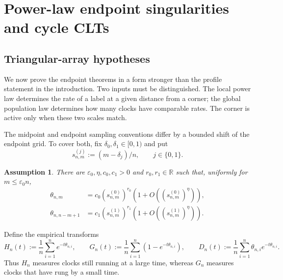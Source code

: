 \documentclass[11pt]{article}
\theoremstyle{remark}
\theoremstyle{plain}
\newtheorem{assumption}[theorem]{Assumption}
\newcommand{\R}{\mathbb R}
\newcommand{\eps}{\varepsilon}
\begin{document}
\section{Power-law endpoint singularities and cycle CLTs}
\label{sec:power-law}

\subsection{Triangular-array hypotheses}

We now prove the endpoint theorems in a form stronger than the profile
statement in the introduction.  Two inputs must be distinguished.  The local
power law determines the rate of a label at a given distance from a corner;
the global population law determines how many clocks have comparable rates.
The corner is active only when these two scales match.

The midpoint and endpoint sampling conventions differ by a bounded shift of
the endpoint grid.  To cover both, fix $\delta_0,\delta_1\in[0,1)$ and put
\[
 s_{n,m}^{(j)}:=(m-\delta_j)/n,
 \qquad j\in\{0,1\}.
\]

\begin{assumption}\label{ass:power-endpoints}
There are $\eps_0,\eta,c_0,c_1>0$ and $r_0,r_1\in\R$ such that, uniformly for
$m\le \eps_0n$,
\begin{align}
 \theta_{n,m}&=c_0(s_{n,m}^{(0)})^{r_0}
   (1+O((s_{n,m}^{(0)})^{\eta})),\label{eq:left-endpoint-power}\\
 \theta_{n,n-m+1}&=c_1(s_{n,m}^{(1)})^{r_1}
   (1+O((s_{n,m}^{(1)})^{\eta})).\label{eq:right-endpoint-power}
\end{align}
\end{assumption}

Define the empirical transforms
\begin{equation}\label{eq:population-transforms}
 H_n(t):=\frac1n\sum_{i=1}^ne^{-t\theta_{n,i}},\qquad
 G_n(t):=\frac1n\sum_{i=1}^n(1-e^{-t\theta_{n,i}}),\qquad
 D_n(t):=\frac1n\sum_{i=1}^n\theta_{n,i}e^{-t\theta_{n,i}}.
\end{equation}
Thus $H_n$ measures clocks still running at a large time, whereas $G_n$
measures clocks that have rung by a small time.
\end{document}
